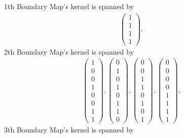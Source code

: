 \documentclass[8pt]{article}
\begin{document}
\centering
1th Boundary Map's kernel is spanned by
 \begin{align*} \left(\begin{array}{r}
1 \\
1 \\
1 \\
1
\end{array}\right) ,
 \end{align*}
 2th Boundary Map's kernel is spanned by
 \begin{align*} \left(\begin{array}{r}
1 \\
0 \\
0 \\
1 \\
0 \\
0 \\
1 \\
1
\end{array}\right) ,
 \left(\begin{array}{r}
0 \\
1 \\
0 \\
1 \\
0 \\
1 \\
1 \\
0
\end{array}\right) ,
 \left(\begin{array}{r}
0 \\
0 \\
1 \\
1 \\
0 \\
1 \\
0 \\
1
\end{array}\right) ,
 \left(\begin{array}{r}
0 \\
0 \\
0 \\
0 \\
1 \\
1 \\
1 \\
1
\end{array}\right) ,
 \end{align*}
 3th Boundary Map's kernel is spanned by
\end{document}
